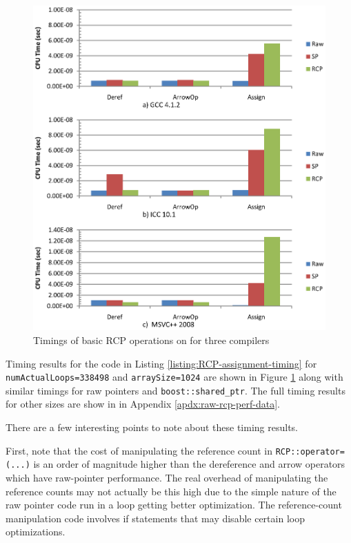 \documentclass[pdf,ps2pdf,11pt]{SANDreport}
\begin{document}
{\bsinglespace
\begin{figure}
\begin{center}
\includegraphics*[angle=0,scale=1.00]{RCPTimings}
\end{center}
\caption{
\label{fig:RCPTimings}
Timings of basic RCP operations on for three compilers}
\end{figure}
\esinglespace}


Timing results for the code in Listing
{}\ref{listing:RCP-assignment-timing} for
{}\texttt{numActualLoops=338498} and {}\texttt{arraySize=1024} are
shown in Figure {}\ref{fig:RCPTimings} along with similar timings for
raw pointers and {}\texttt{boost::shared\_ptr}.  The full timing
results for other sizes are show in in Appendix
{}\ref{apdx:raw-rcp-perf-data}.

There are a few interesting points to note about these timing results.

First, note that the cost of manipulating the reference count in
{}\texttt{RCP::operator=(...)} is an order of magnitude higher than
the dereference and arrow operators which have raw-pointer
performance.  The real overhead of manipulating the reference counts
may not actually be this high due to the simple nature of the raw
pointer code run in a loop getting better optimization.  The
reference-count manipulation code involves if statements that may
disable certain loop optimizations.
\end{document}
